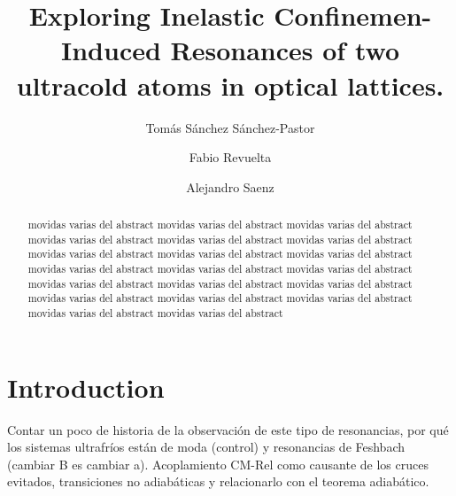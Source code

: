 \documentclass[aps,pre,twocolumn,superscriptaddress,showpacs]{revtex4-1}
\begin{document}
\title{Exploring Inelastic Confinemen-Induced Resonances of two ultracold atoms in optical lattices.}
%
\author{Tom\'as S\'anchez S\'anchez-Pastor}

\author{Fabio Revuelta}

\author{Alejandro Saenz}
%
\begin{abstract}
movidas varias del abstract movidas varias del abstract movidas varias del abstract movidas varias del abstract movidas varias del abstract movidas varias del abstract movidas varias del abstract movidas varias del abstract movidas varias del abstract movidas varias del abstract movidas varias del abstract movidas varias del abstract movidas varias del abstract movidas varias del abstract movidas varias del abstract movidas varias del abstract movidas varias del abstract movidas varias del abstract movidas varias del abstract movidas varias del abstract
\end{abstract}

\maketitle

\section{Introduction}  \label{sec:intro}
Contar un poco de historia de la observación de este tipo de resonancias, por qué los sistemas ultrafríos están de moda (control) y resonancias de Feshbach (cambiar B es cambiar a). Acoplamiento CM-Rel como causante de los cruces evitados, transiciones no adiabáticas y relacionarlo con el teorema adiabático.
\end{document}
